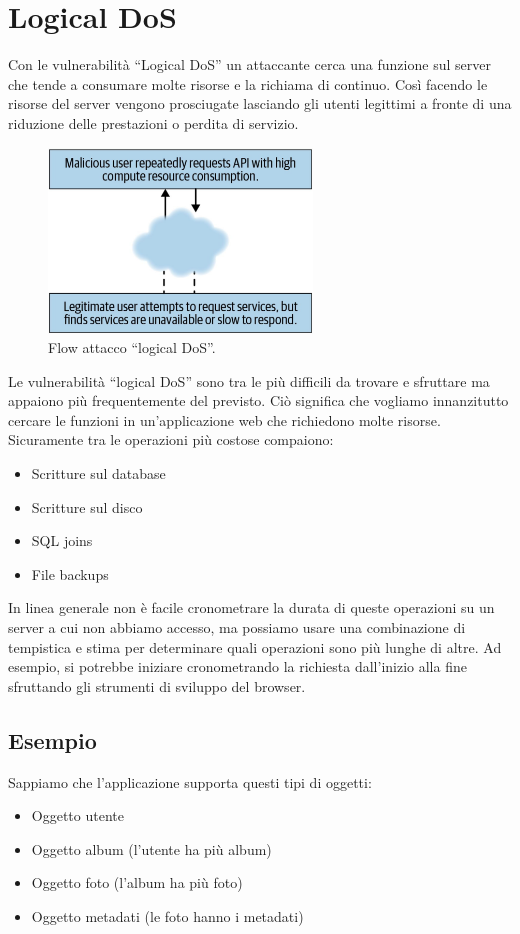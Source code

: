 \newpage

\section{Logical DoS}
Con le vulnerabilità ``Logical DoS'' un attaccante cerca una funzione sul server che tende a consumare molte risorse e la richiama di continuo. Così facendo le risorse del server vengono prosciugate lasciando gli utenti legittimi a fronte di una riduzione delle prestazioni o perdita di servizio. 
\begin{figure}[H]
	\centering
	\includegraphics[width=7cm, keepaspectratio]{capitoli/web_security/imgs/logic_dos_flow.png}
	\caption{Flow attacco ``logical DoS''.}
	\label{fig:logic_dos_flow}
\end{figure}

Le vulnerabilità ``logical DoS'' sono tra le più difficili da trovare e sfruttare ma appaiono più frequentemente del
previsto. Ciò significa che vogliamo innanzitutto cercare le funzioni in un'applicazione web che richiedono molte
risorse. Sicuramente tra le operazioni più costose compaiono:
\begin{itemize}
	\item Scritture sul database
	\item Scritture sul disco
	\item SQL joins
	\item File backups	
\end{itemize}

In linea generale non è facile cronometrare la durata di queste operazioni su un server a cui non abbiamo accesso, ma possiamo usare una combinazione di tempistica e stima per determinare quali operazioni sono più lunghe di altre. Ad esempio, si potrebbe iniziare cronometrando la richiesta dall'inizio alla fine sfruttando gli strumenti di
sviluppo del browser.

\newpage

\subsection{Esempio}
Sappiamo che l'applicazione supporta questi tipi di oggetti:
\begin{itemize}
	\item Oggetto utente
	\item Oggetto album (l'utente ha più album)
	\item Oggetto foto (l'album ha più foto)
	\item Oggetto metadati (le foto hanno i metadati)
\end{itemize}

